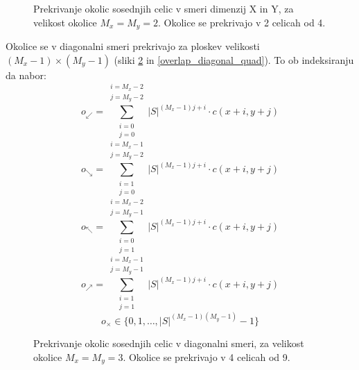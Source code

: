 \documentclass[12pt,a4paper,openany,twoside]{book}
\begin{document}
\vspace{5mm}
\begin{figure}[htb]
\centerline{}
\caption[Prekrivaje okolic \(2 \times 2\) v smeri dimenzij X in Y.]
{Prekrivanje okolic sosednjih celic v smeri dimenzij X in Y, za velikost okolice \(M_x=M_y=2\).
Okolice se prekrivajo v 2 celicah od 4.}
\label{overlap_dimension_quad}
\end{figure}

\vspace{5mm}
Okolice se v diagonalni smeri prekrivajo za ploskev velikosti \((M_x-1) \times (M_y-1)\) (sliki \ref{overlap_diagonal_moore} in \ref{overlap_diagonal_quad}).
To ob indeksiranju da nabor:
\begin{equation}
o_{\swarrow} = \sum_{\substack{i=0 \\ j=0}}^{\substack{i=M_x-2 \\ j=M_y-2}} |S|^{(M_x-1) j + i} \cdot c(x+i,y+j)
\end{equation}
\begin{equation}
o_{\searrow} = \sum_{\substack{i=1 \\ j=0}}^{\substack{i=M_x-1 \\ j=M_y-2}} |S|^{(M_x-1) j + i} \cdot c(x+i,y+j)
\end{equation}
\begin{equation}
o_{\nwarrow} = \sum_{\substack{i=0 \\ j=1}}^{\substack{i=M_x-2 \\ j=M_y-1}} |S|^{(M_x-1) j + i} \cdot c(x+i,y+j)
\end{equation}
\begin{equation}
o_{\nearrow} = \sum_{\substack{i=1 \\ j=1}}^{\substack{i=M_x-1 \\ j=M_y-1}} |S|^{(M_x-1) j + i} \cdot c(x+i,y+j)
\end{equation}
\begin{equation}
o_{\times} \in \{0, 1, \ldots, |S|^{(M_x-1)(M_y-1)}-1\}
\end{equation}

\vspace{5mm}
\begin{figure}[htb]
\centerline{}
\caption[Prekrivanje okolic \(3 \times 3\) - diagonalno.]
{Prekrivanje okolic sosednjih celic v diagonalni smeri, za velikost okolice \(M_x=M_y=3\).
Okolice se prekrivajo v 4 celicah od 9.}
\label{overlap_diagonal_moore}
\end{figure}
\end{document}
